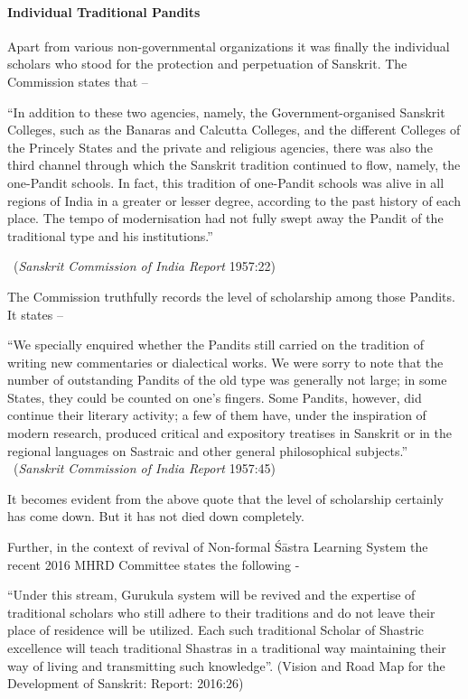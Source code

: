 \paragraph{Individual Traditional Pandits}

Apart from various non-governmental organizations it was finally the individual scholars who stood for the protection and perpetuation of Sanskrit. The Commission states that –
\begin{myquote}
\eleven
“In addition to these two agencies, namely, the Government-organised Sanskrit Colleges, such as the Banaras and Calcutta Colleges, and the different Colleges of the Princely States and the private and religious agencies, there was also the third channel through which the Sanskrit tradition continued to flow, namely, the one-Pandit schools. In fact, this tradition of one-Pandit schools was alive in all regions of India in a greater or lesser degree, according to the past history of each place. The tempo of modernisation had not fully swept away the Pandit of the traditional type and his institutions.” 
\vskip -5pt

~\hfill({\sl Sanskrit Commission of India Report }1957:22)
\end{myquote}

The Commission truthfully records the level of scholarship among those Pandits. It states –
\begin{myquote}
\eleven
“We specially enquired whether the Pandits still carried on the tradition of writing new commentaries or dialectical works. We were sorry to note that the number of outstanding Pandits of the old type was generally not large; in some States, they could be counted on one's fingers. Some Pandits, however, did continue their literary activity; a few of them have, under the inspiration of modern research, produced critical and expository treatises in Sanskrit or in the regional languages on Sastraic and other general philosophical subjects.”\\[-15pt] 

~\hfill({\sl Sanskrit Commission of India Report} 1957:45)
\end{myquote}

It becomes evident from the above quote that the level of scholarship certainly has come down. But it has not died down completely. 

Further, in the context of revival of Non-formal Śāstra Learning System the recent 2016 MHRD Committee states the following - 
\begin{myquote}
\eleven
“Under this stream, Gurukula system will be revived and the expertise of traditional scholars who still adhere to their traditions and do not leave their place of residence will be utilized. Each such traditional Scholar of Shastric excellence will teach traditional Shastras in a traditional way maintaining their way of living and transmitting such knowledge”. \hfill(Vision and Road Map for the Development of Sanskrit: Report: 2016:26) 
\end{myquote}
	
